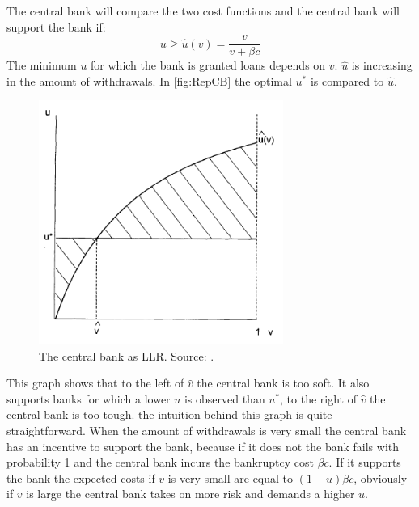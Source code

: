\documentclass[twoside, 12pt]{article}
\numberwithin{equation}{section}
\begin{document}
The central bank will compare the two cost functions and the central bank will support the bank if:
\begin{equation}\label{eq6}
u\geq \hat{u}(v)=\frac{v}{v+\beta c}
\end{equation}
The minimum $u$ for which the bank is granted loans depends on $v$. $\hat{u}$ is increasing in the amount of withdrawals. In \autoref{fig:RepCB} the optimal $u^*$ is compared to $\hat{u}$.

\begin{figure}[htbp]
\begin{centering}
\includegraphics[width=8cm]{RepulloCB2000.png}
\caption{The central bank as LLR. Source: \protect\cite{repullo2000}.}
\label{fig:RepCB}
\end{centering}
\end{figure}

This graph shows that to the left of $\hat{v}$ the central bank is too soft. It also supports banks for which a lower $u$ is observed than $u^*$, to the right of $\hat{v}$ the central bank is too tough. the intuition behind this graph is quite straightforward. When the amount of withdrawals is very small the central bank has an incentive to support the bank, because if it does not the bank fails with probability 1 and the central bank incurs the bankruptcy cost $\beta c$. If it supports the bank the expected costs if $v$ is very small are equal to $(1-u)\beta c$, obviously if $v$ is large the central bank takes on more risk and demands a higher $u$.
\end{document}
